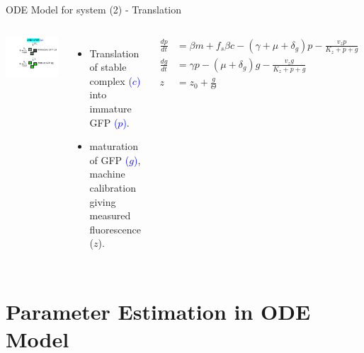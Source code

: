 \documentclass{beamer}
\begin{document}
\begin{frame}{ODE Model for system (2) - Translation}{}
\begin{columns}
\includegraphics[trim = 0 0 0 0,clip = true,scale = 0.31]{Figures/schematic_translation}
  \begin{itemize}
    \item Translation of stable complex \textcolor{blue}{($c$)} into immature GFP \textcolor{blue}{($p$)}. 
    \item maturation of GFP \textcolor{blue}{($g$)}, machine calibration giving measured fluorescence ($z$).
    \end{itemize}
\footnotesize
\begin{align*} 
\frac{dp}{dt} & = \beta m +f_{s}\beta c -(\gamma + \mu + \delta_{g})p - \frac{v_{z}p}{K_{z}+p+g}   \\
\frac{dg}{dt} & = \gamma p - (\mu + \delta_{g})g - \frac{v_{z}g}{K_{z}+p+g} \\
z &= z_{0} +\frac{g}{\Theta} 
\end{align*}
\end{columns}
\end{frame}

\section{Parameter Estimation in ODE Model}
\end{document}
